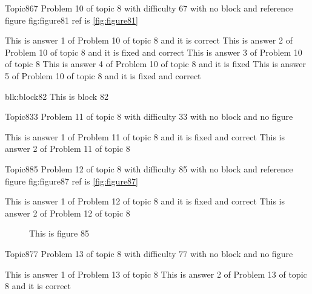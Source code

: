 \documentclass[master]{exam}
\begin{document}
\begin{problem}{Topic8}{67}
	Problem 10 of topic 8 with difficulty 67 with no block and reference figure fig:figure81 ref is \ref{fig:figure81}
	\begin{answers}
		\answer[correct] This is answer 1 of Problem 10 of topic 8 and it is correct
		 This is answer 2 of Problem 10 of topic 8 and it is fixed and correct
		\answer This is answer 3 of Problem 10 of topic 8 
		\answer[fixed] This is answer 4 of Problem 10 of topic 8 and it is fixed
		 This is answer 5 of Problem 10 of topic 8 and it is fixed and correct
	\end{answers}
\end{problem}



\begin{block}{blk:block82}
This is block 82
\end{block}


\begin{problem}{Topic8}{33}
	Problem 11 of topic 8 with difficulty 33 with no block and no figure
	\begin{answers}
		 This is answer 1 of Problem 11 of topic 8 and it is fixed and correct
		\answer This is answer 2 of Problem 11 of topic 8 
	\end{answers}
\end{problem}

\begin{problem}{Topic8}{85}
	Problem 12 of topic 8 with difficulty 85 with no block and reference figure fig:figure87 ref is \ref{fig:figure87}
	\begin{answers}
		 This is answer 1 of Problem 12 of topic 8 and it is fixed and correct
		\answer This is answer 2 of Problem 12 of topic 8 
	\end{answers}
\end{problem}



\begin{figure}
	\begin{center}
		This is figure 85 
		\label{fig:figure85}
	\end{center}
\end{figure}

\begin{problem}{Topic8}{77}
	Problem 13 of topic 8 with difficulty 77 with no block and no figure
	\begin{answers}
		\answer This is answer 1 of Problem 13 of topic 8 
		\answer[correct] This is answer 2 of Problem 13 of topic 8 and it is correct
	\end{answers}
\end{problem}
\end{document}
